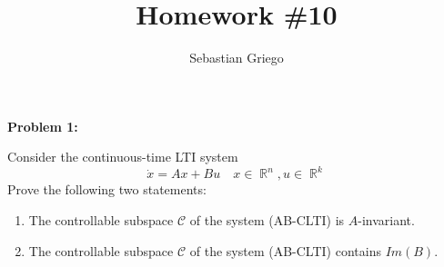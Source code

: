 \documentclass[12pt]{article}
\DeclareMathOperator{\RR}{\mathbb{R}}
\newenvironment{problem}[1]{
    \textbf{Problem #1:}
}{
    \rmfamily \vspace{1em}
}
\begin{document}
\title{Homework \#10}  %
\author{Sebastian Griego}  %
\maketitle

\begin{problem}{1}
Consider the continuous-time LTI system
\[
    \dot{x} = Ax + Bu \quad x \in \RR^n, u \in \RR^k \tag{AB-CLTI}
\]
Prove the following two statements:
\begin{enumerate}[label=(\alph*)]
    \item The controllable subspace \(\mathcal{C}\) of the system (AB-CLTI) is \(A\)-invariant.
    \item The controllable subspace \(\mathcal{C}\) of the system (AB-CLTI) contains \(Im (B)\).
\end{enumerate}
\end{problem}
\end{document}

